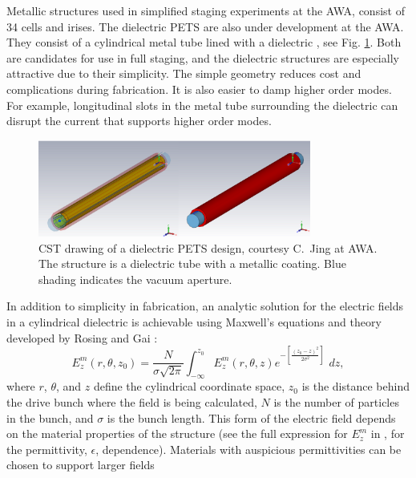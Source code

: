 Metallic structures used in simplified staging experiments at the AWA, consist of 34 cells and irises. 
The dielectric PETS are also under development at the AWA. 
They consist of a cylindrical metal tube lined with a dielectric \cite{PETSeq}, 
see Fig. \ref{fig:PETS}. Both are candidates for use in full staging, and 
the dielectric structures are especially attractive due to their simplicity. 
The simple geometry reduces cost and complications during fabrication.
It is also easier to damp higher order modes. For example, longitudinal slots in the metal tube surrounding
the dielectric can disrupt the current that supports higher order modes.   
\begin{figure}
	\begin{center}
		\includegraphics[width=0.8\textwidth]{images/pets-cst.png}
		\caption{CST drawing of a dielectric PETS design, courtesy C.~Jing at AWA. 
		The structure is a dielectric tube with a metallic coating. Blue shading 
	indicates the vacuum aperture.}
		\label{fig:PETS}
	\end{center}
\end{figure}
In addition to simplicity in fabrication, an analytic solution for the electric fields
in a cylindrical dielectric is achievable using Maxwell's equations and theory developed
by Rosing and Gai \cite{RosingWei}: 
\begin{equation}
E^m_z\left(r,\theta,z_0\right)= \frac{N}{\sigma \sqrt{2\pi}}\int_{-\infty}^{z_0}E^m_z\left(r,\theta,z\right)e^{-\left[\frac{\left(z_0-z\right)^2}{2\sigma^2}\right]}\,\,dz , 
\end{equation}
where $r$, $\theta$, and $z$ define the cylindrical coordinate space, 
$z_0$ is the distance behind the drive bunch where the field is being calculated, 
$N$ is the number of particles in the bunch, and $\sigma$ is the bunch length.
This form of the electric field depends on the material properties of the structure
(see the full expression for $E_z^m$ in \cite{RosingWei}, for the permittivity, $\epsilon$, dependence).
Materials with auspicious permittivities can be chosen to support larger fields
